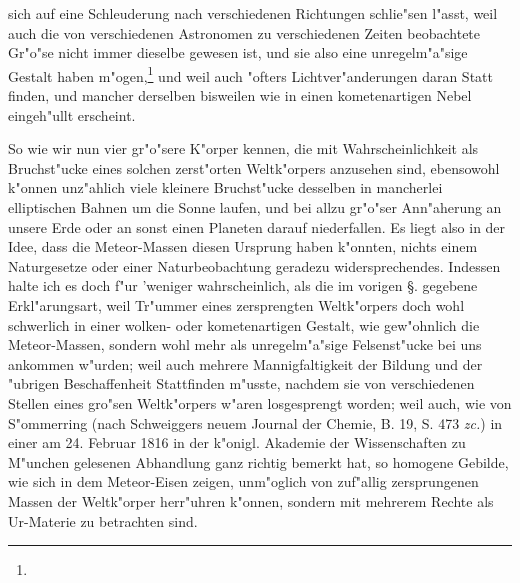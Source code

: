 \documentclass[a4paper, 11pt, oneside, polutonikogreek, german]{article}
\begin{document}
sich auf eine Schleuderung nach verschiedenen Richtungen schlie"sen l"asst, weil auch die von verschiedenen Astronomen zu verschiedenen Zeiten beobachtete Gr"o"se nicht immer dieselbe gewesen ist, und sie also eine unregelm"a"sige Gestalt haben m"ogen,\footnote{} und weil auch "ofters Lichtver"anderungen daran Statt finden, und mancher derselben bisweilen wie in einen kometenartigen Nebel eingeh"ullt erscheint. 

So wie wir nun vier gr"o"sere K"orper kennen, die mit Wahrscheinlichkeit als Bruchst"ucke eines solchen zerst"orten Weltk"orpers anzusehen sind, ebensowohl k"onnen unz"ahlich viele kleinere Bruchst"ucke desselben in mancherlei elliptischen Bahnen um die Sonne laufen, und bei allzu gr"o"ser Ann"aherung an unsere Erde oder an sonst einen Planeten darauf niederfallen. Es liegt also in der Idee, dass die Meteor-Massen diesen Ursprung haben k"onnten, nichts einem Naturgesetze oder einer Naturbeobachtung geradezu widersprechendes. Indessen halte ich es doch f"ur 'weniger wahrscheinlich, als die im vorigen §. gegebene Erkl"arungsart, weil Tr"ummer eines zersprengten Weltk"orpers doch wohl schwerlich in einer wolken- oder kometenartigen Gestalt, wie gew"ohnlich die Meteor-Massen, sondern wohl mehr als unregelm"a"sige Felsenst"ucke bei uns ankommen w"urden; weil auch mehrere Mannigfaltigkeit der Bildung und der "ubrigen Beschaffenheit Stattfinden m"usste, nachdem sie von verschiedenen Stellen eines gro"sen Weltk"orpers w"aren losgesprengt worden; weil auch, wie von S"ommerring (nach Schweiggers neuem Journal der Chemie, B. 19, S. 473 \emph{zc.}) in einer am 24. Februar 1816 in der k"onigl. Akademie der Wissenschaften zu M"unchen gelesenen Abhandlung ganz richtig bemerkt hat, so homogene Gebilde, wie sich in dem Meteor-Eisen zeigen, unm"oglich von zuf"allig zersprungenen Massen der Weltk"orper herr"uhren k"onnen, sondern mit mehrerem Rechte als Ur-Materie zu betrachten sind.
\end{document}
